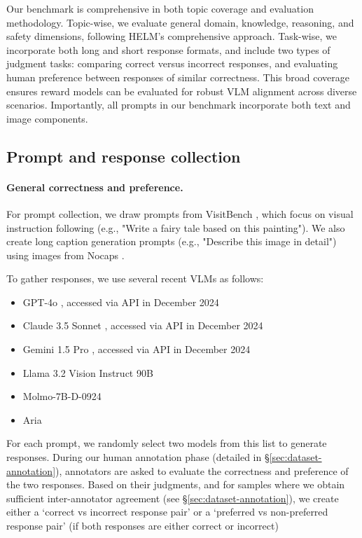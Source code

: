 Our benchmark is comprehensive in both topic coverage and evaluation methodology. Topic-wise, we evaluate general domain, knowledge, reasoning, and safety dimensions, following HELM's \citep{liang2022holistic} comprehensive approach. Task-wise, we incorporate both long and short response formats, and include two types of judgment tasks: comparing correct versus incorrect responses, and evaluating human preference between responses of similar correctness. This broad coverage ensures reward models can be evaluated for robust VLM alignment across diverse scenarios. Importantly, all prompts in our benchmark incorporate both text and image components. 



\subsection{Prompt and response collection}
\label{sec:dataset-prompt}

\paragraph{General correctness and preference.}
For prompt collection, we draw prompts from VisitBench \citep{bitton2023visit}, which focus on visual instruction following (e.g., "Write a fairy tale based on this painting"). We also create long caption generation prompts (e.g., "Describe this image in detail") using images from Nocaps \citep{agrawal2019nocaps}.

To gather responses, we use several recent VLMs as follows:
\begin{itemize}
\setlength{\leftskip}{0mm}
\setlength{\itemsep}{-0mm}
    \item GPT-4o \citep{gpt4o}, accessed via API in December 2024
    \item Claude 3.5 Sonnet \citep{claude3.5}, accessed via API in December 2024
    \item Gemini 1.5 Pro \citep{team2024gemini}, accessed via API in December 2024
    \item Llama 3.2 Vision Instruct 90B \citep{llama3}
    \item Molmo-7B-D-0924 \citep{deitke2024molmo}
    \item Aria \citep{aria}
\end{itemize}
For each prompt, we randomly select two models from this list to generate responses. 
During our human annotation phase (detailed in \S \ref{sec:dataset-annotation}), annotators are asked to evaluate the correctness and preference of the two responses. Based on their judgments, and for samples where we obtain sufficient inter-annotator agreement (see \S \ref{sec:dataset-annotation}), we create either a `correct vs incorrect response pair' or a `preferred vs non-preferred response pair' (if both responses are either correct or incorrect)


